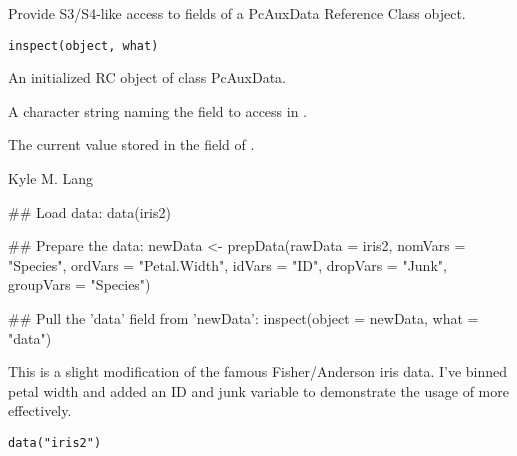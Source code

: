 \documentclass[letterpaper]{book}
\begin{document}
%
\begin{Description}\relax
Provide S3/S4-like access to fields of a PcAuxData Reference Class
object.
\end{Description}
%
\begin{Usage}
\begin{verbatim}
inspect(object, what)
\end{verbatim}
\end{Usage}
%
\begin{Arguments}
\begin{ldescription}
\item[\code{object}] 
An initialized RC object of class PcAuxData.

\item[\code{what}] 
A character string naming the field to access in .

\end{ldescription}
\end{Arguments}
%
\begin{Value}
The current value stored in the  field of .
\end{Value}
%
\begin{Author}\relax
Kyle M. Lang
\end{Author}
%
\begin{Examples}
\begin{ExampleCode}
## Load data:
data(iris2)

## Prepare the data:
newData <- prepData(rawData   = iris2,
                    nomVars   = "Species",
                    ordVars   = "Petal.Width",
                    idVars    = "ID",
                    dropVars  = "Junk",
                    groupVars = "Species")

## Pull the 'data' field from 'newData':
inspect(object = newData, what = "data")
\end{ExampleCode}
\end{Examples}
%
\begin{Description}\relax
This is a slight modification of the famous Fisher/Anderson iris
data. I've binned petal width and added an ID and junk variable to
demonstrate the usage of  more effectively.
\end{Description}
%
\begin{Usage}
\begin{verbatim}
data("iris2")
\end{verbatim}
\end{Usage}
\end{document}
